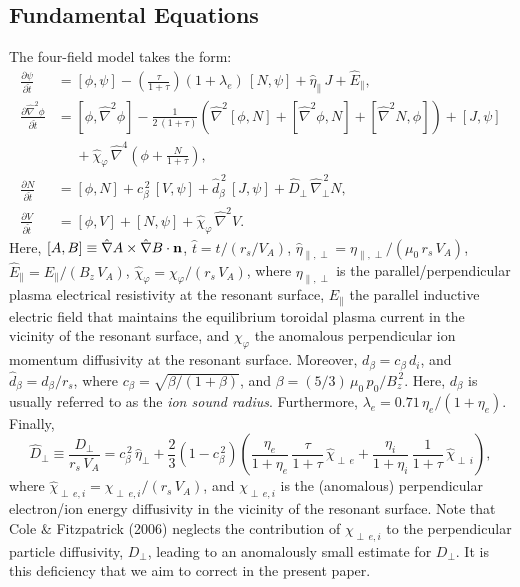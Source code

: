 \documentclass[12pt,prb,aps]{revtex4-1}
\begin{document}
\subsection{Fundamental Equations}
The four-field model takes the form:\cite{fw}
\begin{align}
\frac{\partial\psi}{\partial\hat{t}}&= [\phi,\psi] -\left(\frac{\tau}{1+\tau}\right)(1+\lambda_e)\,[N,\psi]
+\hat{\eta}_\parallel\,J + \hat{E}_\parallel,\\[0.5ex]
\frac{\partial \hat{\nabla}^2\phi}{\partial \hat{t}}&= [\phi,\hat{\nabla}^2\phi] - \frac{1}{2\,(1+\tau)}\left(\hat{\nabla}^2[\phi,N] + [\hat{\nabla}^2\phi,N] + [\hat{\nabla}^2 N,\phi]\right) + [J,\psi] \nonumber\\[0.5ex]&\phantom{=}+\hat{\chi}_\varphi  \,\hat{\nabla}^4\!\left(\phi + \frac{N}{1+\tau}\right), \\[0.5ex]
\frac{\partial N}{\partial \hat{t}}&= [\phi,N] +c_\beta^{\,2}\,[V,\psi] +\hat{d}_\beta^{\,2}\,[J,\psi]
+ \hat{D}_\perp\,\hat{\nabla}_\perp^{\,2}N,\\[0.5ex]
\frac{\partial V}{\partial\hat{t}}&= [\phi,V] +[N,\psi] + \hat{\chi}_\varphi\,\hat{\nabla}^2 V.\label{e21}
\end{align}
Here, $[A,B]\equiv \hat{\nabla} A\times \hat{\nabla} B\cdot {\bf n}$, $\hat{t} = t/(r_s/V_A)$, $\hat{\eta}_{\parallel,\perp} = \eta_{\parallel,\perp}/(\mu_0\,r_s\,V_A)$, $\hat{E}_\parallel = E_\parallel/(B_z\,V_A)$, 
$\hat{\chi}_\varphi= \chi_\varphi/(r_s\,V_A)$, where $\eta_{\parallel,\perp}$ is the parallel/perpendicular plasma electrical
resistivity at the resonant surface, $E_\parallel$ the parallel inductive electric field that maintains the equilibrium toroidal
plasma current in the vicinity of the resonant surface, and $\chi_\varphi$  the anomalous perpendicular ion momentum
diffusivity at the resonant surface. 
Moreover, $d_\beta=c_\beta\,d_i$, and $\hat{d}_\beta=d_\beta/r_s$, where $c_\beta = \sqrt{\beta/(1+\beta)}$, and
$\beta=(5/3)\,\mu_0\,p_0/B_z^{\,2}$. Here, $d_\beta$ is usually referred to as the {\em ion sound radius}. Furthermore,
$\lambda_e=0.71\,\eta_e/(1+\eta_e)$. Finally,\cite{fw}
\begin{equation}
\hat{D}_\perp \equiv \frac{D_{\perp}}{r_s\,V_A}= c_\beta^{\,2}\,\hat{\eta}_\perp +  \frac{2}{3}\left(1-c_\beta^{\,2}\right)\!\left(\frac{\eta_e}{1+\eta_e}\,\frac{\tau}{1+\tau}\,\hat{\chi}_{\perp\,e} + \frac{\eta_i}{1+\eta_i}\,\frac{1}{1+\tau}\,\hat{\chi}_{\perp\,i}\right),
\end{equation}
where $\hat{\chi}_{\perp\,e,i}=\chi_{\perp\,e,i}/(r_s\,V_A)$, and $\chi_{\perp\,e,i}$ is the (anomalous)
perpendicular electron/ion  energy diffusivity in the vicinity of the resonant surface. 
Note that Cole \& Fitzpatrick (2006) neglects the contribution of $\chi_{\perp\,e,i}$ to the perpendicular particle
diffusivity, $D_\perp$, leading to an anomalously small estimate for $D_\perp$. It is this deficiency that we aim to
correct in the present paper. 
\end{document}
